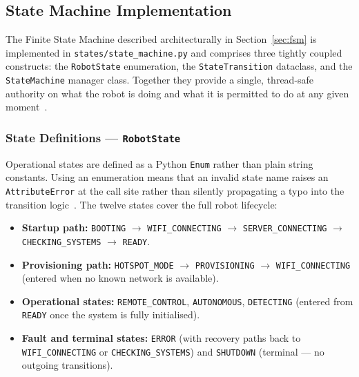 %
%
%
%


\subsection{State Machine Implementation}
\label{sec:fsm_impl}
 
The Finite State Machine described architecturally in
Section~\ref{sec:fsm} is implemented in
\texttt{states/state\_machine.py} and comprises three tightly coupled
constructs: the \texttt{RobotState} enumeration, the
\texttt{StateTransition} dataclass, and the \texttt{StateMachine}
manager class. Together they provide a single, thread-safe authority
on what the robot is doing and what it is permitted to do at any given
moment~\cite{hopcroft2006automata}.
 
\subsubsection{State Definitions — \texttt{RobotState}}
 
Operational states are defined as a Python \texttt{Enum} rather than
plain string constants. Using an enumeration means that an invalid
state name raises an \texttt{AttributeError} at the call site rather
than silently propagating a typo into the transition
logic~\cite{martin2008clean}. The twelve states cover the full robot
lifecycle:
 
\begin{itemize}
    \item \textbf{Startup path:} \texttt{BOOTING} $\to$
          \texttt{WIFI\_CONNECTING} $\to$ \texttt{SERVER\_CONNECTING}
          $\to$ \texttt{CHECKING\_SYSTEMS} $\to$ \texttt{READY}.
    \item \textbf{Provisioning path:} \texttt{HOTSPOT\_MODE} $\to$
          \texttt{PROVISIONING} $\to$ \texttt{WIFI\_CONNECTING}
          (entered when no known network is available).
    \item \textbf{Operational states:} \texttt{REMOTE\_CONTROL},
          \texttt{AUTONOMOUS}, \texttt{DETECTING} (entered from
          \texttt{READY} once the system is fully initialised).
    \item \textbf{Fault and terminal states:} \texttt{ERROR} (with
          recovery paths back to \texttt{WIFI\_CONNECTING} or
          \texttt{CHECKING\_SYSTEMS}) and \texttt{SHUTDOWN}
          (terminal — no outgoing transitions).
\end{itemize}
 
